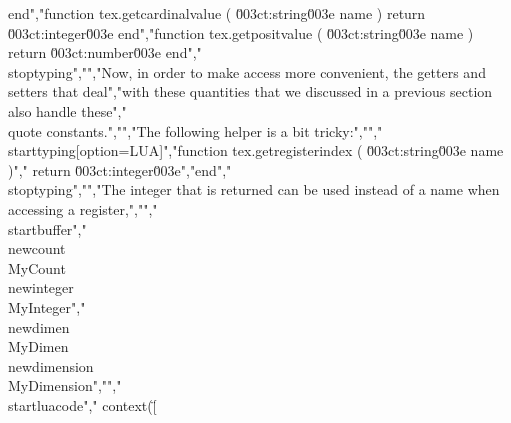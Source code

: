 end","function tex.getcardinalvalue  ( \u003ct:string\u003e name ) return \u003ct:integer\u003e end","function tex.getpositvalue     ( \u003ct:string\u003e name ) return \u003ct:number\u003e  end","\\stoptyping","","Now, in order to make access more convenient, the getters and setters that deal","with these quantities that we discussed in a previous section also handle these","\\quote {constants}.","","The following helper is a bit tricky:","","\\starttyping[option=LUA]","function tex.getregisterindex ( \u003ct:string\u003e name )","    return \u003ct:integer\u003e","end","\\stoptyping","","The integer that is returned can be used instead of a name when accessing a register,","","\\startbuffer","\\newcount \\MyCount  \\newinteger   \\MyInteger","\\newdimen \\MyDimen  \\newdimension \\MyDimension","","\\startluacode","    context(\"[%